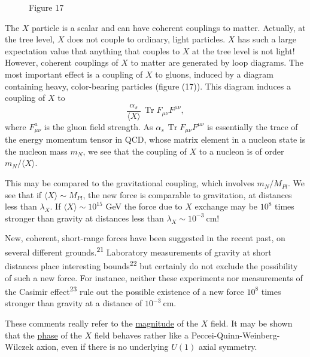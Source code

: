 \begin{figure}
\vspace{-0.8\baselineskip}
\centering

\par\smallskip
Figure 17
\vspace{-0.6\baselineskip}
\end{figure}

The $X$ particle is a scalar and can have coherent couplings to
matter. Actually, at the tree level, $X$ does not couple to ordinary,
light particles. $X$ has such a large expectation value that anything
that couples to $X$ at the tree level is not light! However, coherent
couplings of $X$ to matter are generated by loop diagrams. The most
important effect is a coupling of $X$ to gluons, induced by a diagram
containing heavy, color-bearing particles (figure (17)). This diagram
induces a coupling of $X$ to
\[
\frac{\alpha_s}{\langle X \rangle}\, \operatorname{Tr} F_{\mu\nu} F^{\mu\nu},
\]
where $F_{\mu\nu}^a$ is the
gluon field strength. As
$\alpha_s\, \operatorname{Tr} F_{\mu\nu} F^{\mu\nu}$ is essentially the
trace of the energy momentum tensor
in QCD, whose matrix element
in a nucleon state is the nucleon
mass $m_N$, we see that the coupling
of $X$ to a nucleon is of order
$m_N/\langle X \rangle$.

This may be compared to the
gravitational coupling, which involves
$m_N/M_{Pl}$. We see that if
$\langle X \rangle \sim M_{Pl}$, the new force is comparable to gravitation, at
distances less than $\lambda_X$. If $\langle X \rangle \sim 10^{15}$
GeV the force due to $X$ exchange may be $10^8$ times stronger than
gravity at distances less than $\lambda_X \sim 10^{-3}\ \mathrm{cm}$!

New, coherent, short-range forces have been suggested in the
recent past, on several different grounds.\textsuperscript{21} Laboratory measurements
of gravity at short distances place interesting bounds\textsuperscript{22} but
certainly do not exclude the possibility of such a new force. For
instance, neither these experiments nor measurements of the Casimir
effect\textsuperscript{23} rule out the possible existence of a new force $10^8$ times
stronger than gravity at a distance of $10^{-3}\ \mathrm{cm}$.

These comments really refer to the \underline{magnitude} of the $X$ field.
It may be shown that the \underline{phase} of the $X$ field behaves rather like a
Peccei-Quinn-Weinberg-Wilczek axion, even if there is no underlying
$U(1)$ axial symmetry.

